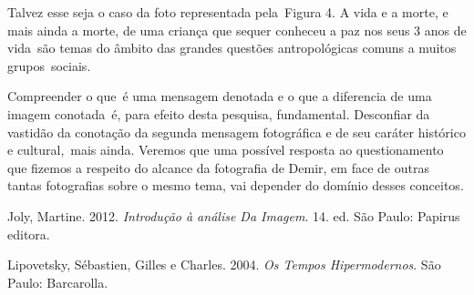 \documentclass[
  letterpaper,
]{abntex2}
\newlength{\cslhangindent}
\newlength{\cslentryspacingunit} %
\newenvironment{CSLReferences}[2] %
 {%
  \setlength{\parindent}{0pt}
  \ifodd #1
  \let\oldpar\par
  \def\par{\hangindent=\cslhangindent\oldpar}
  \fi
  \setlength{\parskip}{#2\cslentryspacingunit}
 }%
 {}
\begin{document}
Talvez esse seja o caso da foto representada pela~Figura 4. A vida e a
morte, e mais ainda a morte, de uma criança que sequer conheceu a paz
nos seus 3 anos de vida~são temas do âmbito das grandes questões
antropológicas comuns a muitos grupos~sociais.

Compreender o que~é uma mensagem denotada e o que a diferencia de uma
imagem conotada~é, para efeito desta pesquisa, fundamental. Desconfiar
da vastidão da conotação da segunda mensagem fotográfica e de seu
caráter histórico e cultural,~mais ainda. Veremos que uma possível
resposta ao questionamento que fizemos a respeito do alcance da
fotografia de Demir, em face de outras tantas fotografias sobre o mesmo
tema, vai depender do domínio desses conceitos.

\hypertarget{refs}{}
\begin{CSLReferences}{1}{0}
\leavevmode{}%
Joly, Martine. 2012. \emph{Introdu{ç}{ã}o {à} an{á}lise Da Imagem}. 14.
ed. S{ã}o Paulo: Papirus editora.

\leavevmode{}%
Lipovetsky, Sébastien, Gilles e Charles. 2004. \emph{Os Tempos
Hipermodernos}. S{ã}o Paulo: Barcarolla.

\end{CSLReferences}
\end{document}

